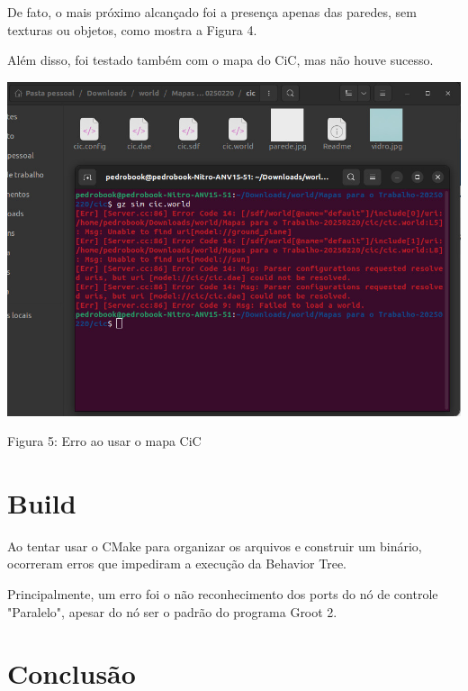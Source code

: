 \documentclass[a4 paper]{article}
\newcommand{\parag}{\hspace{30pt}}
\begin{document}
De fato,  o mais próximo alcançado foi a presença apenas das paredes, sem texturas ou objetos, como mostra a Figura 4.


Além disso, foi testado também com o mapa do CiC, mas não houve sucesso.


\begin{table}[h]
\centering
\includegraphics[scale=0.4]{figuras/cicerror}
\end{table}
\begin{center}
Figura 5: Erro ao usar o mapa CiC
\end{center}

\section{Build}
\parag Ao tentar usar o CMake para organizar os arquivos e construir um binário, ocorreram erros que impediram a execução da Behavior Tree. 

Principalmente, um erro foi o não reconhecimento dos ports do nó de controle "Paralelo", apesar do nó ser o padrão do programa Groot 2. 




\section{Conclusão}
\end{document}
